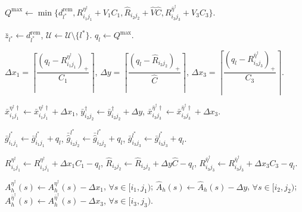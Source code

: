 \documentclass[10pt, reqno]{amsart}
\begin{document}
\begin{algorithm}[!htbp]
\begin{algorithmic}[1]
        \State
        $Q^{\max}
        \leftarrow
        \min\{
        d_{l^*}^{\mathrm{rem}},
        R_{i_1j_1}^{\eta^\dagger}+V_1C_1,
        \widehat R_{i_2j_2}+\widehat V\widehat C,
        R_{i_3j_3}^{\bar\eta^\dagger}+V_3C_3
        \}$.

            $\bar z_{l^*}\leftarrow d_{l^*}^{\mathrm{rem}}$,
            $\mathcal U\leftarrow\mathcal U\setminus\{l^*\}$.
        \Else
            $q_l\leftarrow Q^{\max}$.

            \State
            $\Delta x_1
            =
            \left\lceil
            \dfrac{(q_l-R_{i_1j_1}^{\eta^\dagger})_+}{C_1}
            \right\rceil$,
            $\Delta y
            =
            \left\lceil
            \dfrac{(q_l-\widehat R_{i_2j_2})_+}{\widehat C}
            \right\rceil$,
            $\Delta x_3
            =
            \left\lceil
            \dfrac{(q_l-R_{i_3j_3}^{\bar\eta^\dagger})_+}{C_3}
            \right\rceil$.

            \State
            $\bar x_{i_1j_1}^{\eta^\dagger\dagger}
            \leftarrow
            \bar x_{i_1j_1}^{\eta^\dagger\dagger}+\Delta x_1$,
            $\bar y_{i_2j_2}^{\dagger}
            \leftarrow
            \bar y_{i_2j_2}^{\dagger}+\Delta y$,
            $\bar x_{i_3j_3}^{\bar\eta^\dagger\dagger}
            \leftarrow
            \bar x_{i_3j_3}^{\bar\eta^\dagger\dagger}+\Delta x_3$.

            \State
            $\bar g_{i_1j_1}^{l^*}
            \leftarrow
            \bar g_{i_1j_1}^{l^*}+q_l$,
            $\bar{\widehat g}_{i_2j_2}^{l^*}
            \leftarrow
            \bar{\widehat g}_{i_2j_2}^{l^*}+q_l$,
            $\bar g_{i_3j_3}^{l^*}
            \leftarrow
            \bar g_{i_3j_3}^{l^*}+q_l$.

            \State
            $R_{i_1j_1}^{\eta^\dagger}
            \leftarrow
            R_{i_1j_1}^{\eta^\dagger}+\Delta x_1C_1-q_l$,
            $\widehat R_{i_2j_2}
            \leftarrow
            \widehat R_{i_2j_2}+\Delta y\widehat C-q_l$,
            $R_{i_3j_3}^{\bar\eta^\dagger}
            \leftarrow
            R_{i_3j_3}^{\bar\eta^\dagger}+\Delta x_3C_3-q_l$.

            \State
            $A_h^{\eta^\dagger}(s)
            \leftarrow
            A_h^{\eta^\dagger}(s)-\Delta x_1$,
            $\forall s\in[i_1,j_1)$;
            $\widehat A_h(s)
            \leftarrow
            \widehat A_h(s)-\Delta y$,
            $\forall s\in[i_2,j_2)$;
            $A_h^{\bar\eta^\dagger}(s)
            \leftarrow
            A_h^{\bar\eta^\dagger}(s)-\Delta x_3$,
            $\forall s\in[i_3,j_3)$.


\end{algorithmic}
\end{algorithm}
\end{document}
